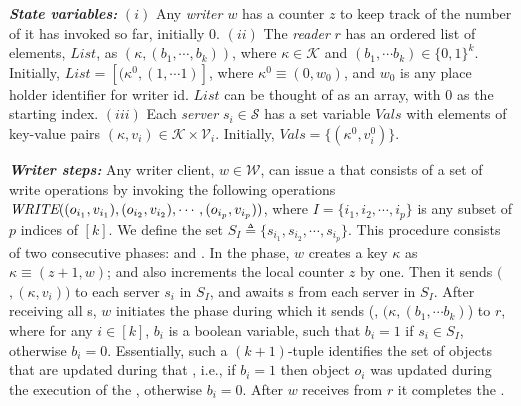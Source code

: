 \textit{\textbf{State variables:}} %
$(i)$ Any  \emph{writer $w$} has  a counter $z$ to keep track of the
number of \wots{}  it  has  invoked so far, initially $0$.
$(ii)$ The  \emph{reader} $r$ has an 
ordered list of elements, $List$, as $(\kappa, (b_1, \cdots, b_k))$,  where 
$\kappa  \in \mathcal{K}$  and 
$(b_1, \cdots b_k) \in  \{0, 1\}^k$. Initially,  
$List= [ ({\kappa}^0, (1, \cdots 1) ]$, where ${\kappa}^0  \equiv (0, w_0)$, 
and $w_0$ is any
place holder identifier for writer id. $List$ can be thought of as an array, with $0$ as the starting index.
$(iii)$ Each   \emph{server} $s_i \in \mathcal{S}$  has  a set variable $Vals$ 
with elements 
of key-value pairs $({\kappa}, v_i) \in \mathcal{K} \times \mathcal{V}_i$. Initially,
$Vals= \{ ({\kappa}^0, v_i^0)\}$. 

\textit{\textbf{Writer steps:}} Any writer client, $w \in \mathcal{W}$, can issue a \wot{} that consists of a set of write operations by invoking the following operations ${\textit{WRITE}( (o_{i_1}, v_{i_1}), (o_{i_2}, v_{i_2}), \cdots, (o_{i_p}, v_{i_p}) )}$, 
where  $I = \{i_1, i_2, \cdots, i_p\}$ is  any subset of $p$ indices of $[k]$. We define the set  $S_I\triangleq \{s_{i_1}, s_{i_2}, \cdots, s_{i_p}\}$.      
This procedure consists of two consecutive phases: {\writeValue} and {\informReader}.  In the {\writeValue} phase,  $w$ creates a key ${\kappa}$ as  $ {\kappa}  \equiv (z + 1, w)$; and also increments the local counter $z$ by one.   Then it sends $(${\writeValueTag}$, ({\kappa}, v_{i}))$ to each server $s_i$ in $S_I$, and awaits {\ackTag}s  
from each server  in $S_I$.  After receiving all {\ackTag}s,    $w$ initiates the {\informReader} phase during which  it sends 
(\informReaderTag, $({\kappa}, (b_{1}, \cdots b_{k})$) to $r$, where for any $i \in [k]$, $b_i$ is a boolean variable, such that $b_i=1$ if $s_i \in S_I$, otherwise $b_i=0$. 
Essentially, such a $(k+1)$-tuple
identifies the set of objects that are updated during that \wot{}, i.e., if $b_i=1$ then object 
$o_i$ was updated 
during the execution of the  \wot{}, otherwise $b_i=0$.  
After $w$ receives    {\ackTag} 
from $r$ it completes the \wot{}. 

